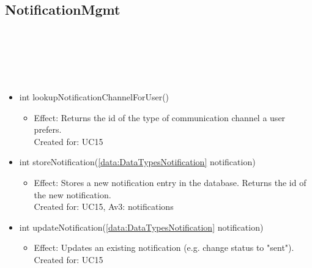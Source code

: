   \subsection{NotificationMgmt}\label{int:DatabaseDatabaseNotificationMgmt}
    \begin{description}
      \item[Provided by:] \iconcomponent{}~
      \item[Required by:] \iconcomponent{}~
      \item[Operations:] ~
    \begin{itemize}[noitemsep,nolistsep,leftmargin=-.25cm]
      \item \textsf{int lookupNotificationChannelForUser()}
        \begin{itemize}[noitemsep,nolistsep]
           \item Effect: Returns the id of the type of communication channel a user prefers. \\
Created for: UC15
        \end{itemize}
      \item \textsf{int storeNotification(\ref{data:DataTypesNotification} notification)}
        \begin{itemize}[noitemsep,nolistsep]
           \item Effect: Stores a new notification entry in the database. Returns the id of the new notification. \\
Created for: UC15, Av3: notifications
        \end{itemize}
      \item \textsf{int updateNotification(\ref{data:DataTypesNotification} notification)}
        \begin{itemize}[noitemsep,nolistsep]
           \item Effect: Updates an existing notification (e.g. change status to "sent"). \\
Created for: UC15
        \end{itemize}
    \end{itemize}
    \end{description}

